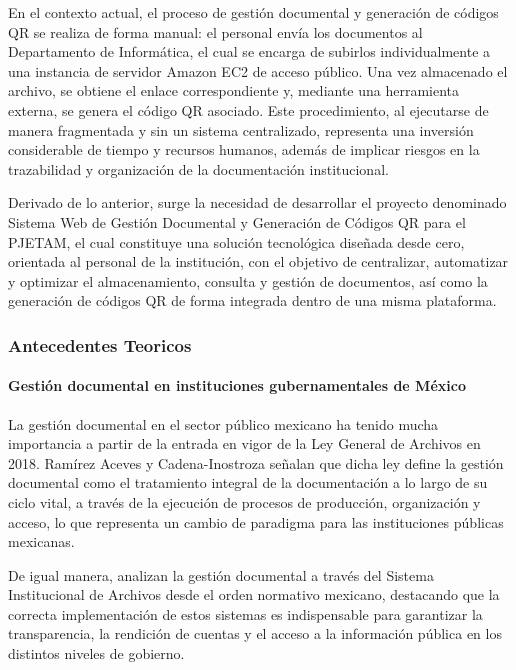 En el contexto actual, el proceso de gestión documental y generación de códigos QR se realiza de forma manual: el personal envía los documentos al Departamento de Informática, el cual se encarga de subirlos individualmente a una instancia de servidor Amazon EC2 de acceso público. Una vez almacenado el archivo, se obtiene el enlace correspondiente y, mediante una herramienta externa, se genera el código QR asociado. Este procedimiento, al ejecutarse de manera fragmentada y sin un sistema centralizado, representa una inversión considerable de tiempo y recursos humanos, además de implicar riesgos en la trazabilidad y organización de la documentación institucional.

Derivado de lo anterior, surge la necesidad de desarrollar el proyecto denominado Sistema Web de Gestión Documental y Generación de Códigos QR para el PJETAM, el cual constituye una solución tecnológica diseñada desde cero, orientada al personal de la institución, con el objetivo de centralizar, automatizar y optimizar el almacenamiento, consulta y gestión de documentos, así como la generación de códigos QR de forma integrada dentro de una misma plataforma.

\subsubsection{Antecedentes Teoricos}
\label{subsec:antecedentes_teoricos}
\paragraph{Gestión documental en instituciones gubernamentales de México}
\label{par:getionDocumentos_antecedentes_teoricos}
La gestión documental en el sector público mexicano ha tenido mucha importancia a partir de la entrada en vigor de la Ley General de Archivos en 2018. Ramírez Aceves y Cadena-Inostroza \cite{ramirez2021gestion} señalan que dicha ley define la gestión documental como el tratamiento integral de la documentación a lo largo de su ciclo vital, a través de la ejecución de procesos de producción, organización y acceso, lo que representa un cambio de paradigma para las instituciones públicas mexicanas.

De igual manera, \cite{sosa2022gestion} analizan la gestión documental a través del Sistema Institucional de Archivos desde el orden normativo mexicano, destacando que la correcta implementación de estos sistemas es indispensable para garantizar la transparencia, la rendición de cuentas y el acceso a la información pública en los distintos niveles de gobierno. 

